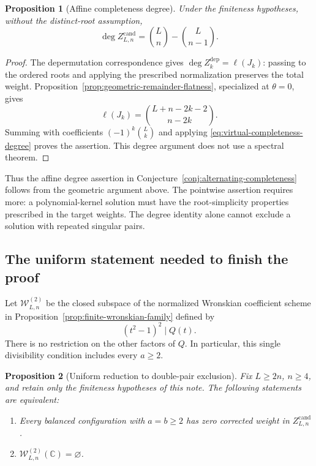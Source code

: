 \documentclass[11pt]{article}
\newtheorem{proposition}{Proposition}[section]
\theoremstyle{definition}
\newcommand{\C}{\mathbb C}
\begin{document}
\begin{proposition}[Affine completeness degree]
\label{prop:affine-completeness-degree}
Under the finiteness hypotheses, without the distinct-root assumption,
\[
 \deg Z^{\mathrm{cand}}_{L,n}
 =\binom Ln-\binom L{n-1}.
\]
\end{proposition}

\begin{proof}
The depermutation correspondence gives
$\deg Z_k^{\mathrm{dep}}=\ell(J_k)$: passing to the ordered roots
and applying the prescribed normalization preserves the total weight.
Proposition~\ref{prop:geometric-remainder-flatness}, specialized at
$\theta=0$, gives
\[
 \ell(J_k)=\binom{L+n-2k-2}{n-2k}.
\]
Summing with coefficients $(-1)^k\binom Lk$ and applying
\eqref{eq:virtual-completeness-degree} proves the assertion. This
degree argument does not use a spectral theorem.
\end{proof}

Thus the affine degree assertion in
Conjecture~\ref{conj:alternating-completeness} follows from the
geometric argument above. The pointwise assertion requires more: a
polynomial-kernel solution must have the root-simplicity properties
prescribed in the target weights. The degree identity alone cannot
exclude a solution with repeated singular pairs.

\subsection{The uniform statement needed to finish the proof}

Let $\mathcal W^{(2)}_{L,n}$ be the closed subspace of the normalized
Wronskian coefficient scheme in
Proposition~\ref{prop:finite-wronskian-family} defined by
\[
 (t^2-1)^2\mid Q(t).
\]
There is no restriction on the other factors of $Q$. In particular,
this single divisibility condition includes every $a\ge2$.

\begin{proposition}[Uniform reduction to double-pair exclusion]
\label{prop:balanced-uniform-reduction}
Fix $L\ge2n$, $n\ge4$, and retain only the finiteness hypotheses
of this note. The following statements are equivalent:
\begin{enumerate}
 \item Every balanced configuration with $a=b\ge2$ has zero
 corrected weight in $Z^{\mathrm{cand}}_{L,n}$.
 \item $\mathcal W^{(2)}_{L,n}(\C)=\varnothing$.
\end{enumerate}
\end{proposition}
\end{document}
